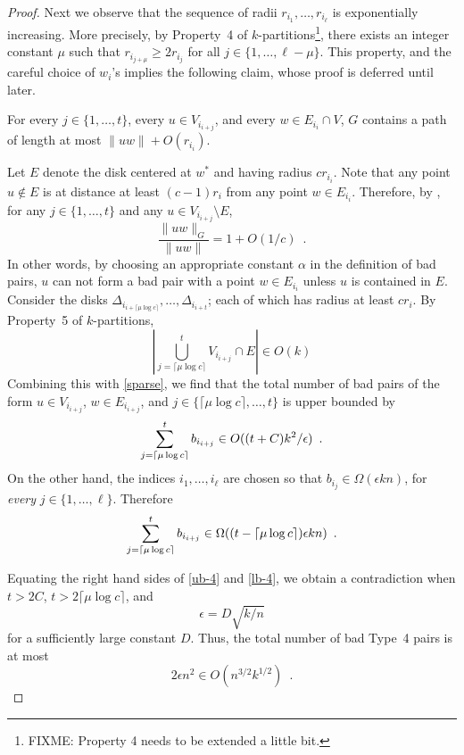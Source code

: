 \documentclass{patmorin}
\begin{document}
\begin{proof}
  Next we observe that the sequence of radii $r_{i_1},\ldots,r_{i_\ell}$
  is exponentially increasing.  More precisely, by Property~4 of
  $k$-partitions\footnote{FIXME: Property 4 needs to be extended a little
  bit.}, there exists an integer constant $\mu$ such that $r_{i_{j+\mu}}
  \ge 2r_{i_j}$ for all $j\in\{1,\ldots,\ell-\mu\}$.  This property,
  and the careful choice of $w_i$'s implies the following claim, whose
  proof is deferred until later.
  \begin{clm}
    For every $j\in\{1,\ldots,t\}$, every $u\in V_{i_{i+j}}$, and
    every $w\in E_{i_i}\cap V$, $G$ contains a path of length at most
    $\|uw\|+O(r_{i_i})$.
  \end{clm}

  Let $E$ denote the disk centered at $w^*$ and having radius $cr_{i_i}$.
  Note that any point $u\not\in E$ is at distance at least $(c-1)r_i$
  from any point $w\in E_{i_i}$.  Therefore, by , for any
  $j\in\{1,\ldots,t\}$ and any $u\in V_{i_{i+j}}\setminus E$,
  \[  
     \frac{\|uw\|_G}{\|uw\|} = 1+O(1/c) \enspace . 
  \]
  In other words, by choosing an appropriate constant $\alpha$ in the
  definition of bad pairs, $u$ can not form a bad pair with a point
  $w\in E_{i_i}$ unless $u$ is contained in $E$.  Consider the disks
  $\Delta_{i_{i+\lceil\mu\log c\rceil}},\ldots,\Delta_{i_{i+t}}$; each
  of which has radius at least $cr_i$.  By Property~5 of $k$-partitions,
  \[
    \left|\bigcup_{j=\lceil\mu\log c\rceil}^t V_{i_{i+j}}\cap E\right|
      \in O(k)
  \]
  Combining this with \eqref{sparse}, we find that the total number
  of bad pairs of the form $u\in V_{i_{i+j}}$, $w\in E_{i_{i+j}}$,
  and $j\in\{\lceil\mu\log c\rceil,\ldots,t\}$ is upper bounded by
  \begin{equation}
     \sum_{j=\lceil\mu\log c\rceil}^t b_{i_{i+j}} 
        \in O((t+C)k^2/\epsilon) \enspace . \eqlabel{ub-4}
  \end{equation}
  On the other hand, the indices $i_1,\ldots,i_\ell$ are chosen
  so that $b_{i_j}\in\Omega(\epsilon kn)$, for \emph{every}
  $j\in\{1,\ldots,\ell\}$.  Therefore
  \begin{equation}
    \sum_{j=\lceil\mu\log c\rceil}^t b_{i_{i+j}} 
        \in \Omega((t-\lceil\mu\log c\rceil)\epsilon kn) \enspace .
        \eqlabel{lb-4}
  \end{equation}
 
  Equating the right hand sides of \eqref{ub-4} and \eqref{lb-4}, we
  obtain a contradiction when $t>2C$, $t>2\lceil\mu\log c\rceil$, and
  \[
      \epsilon = D\sqrt{k/n}
  \] 
  for a sufficiently large constant $D$.
  Thus, the total number of bad Type~4 pairs is at most
  \[
    2\epsilon n^2 \in O(n^{3/2}k^{1/2}) \enspace .
  \]


\end{proof}
\end{document}
